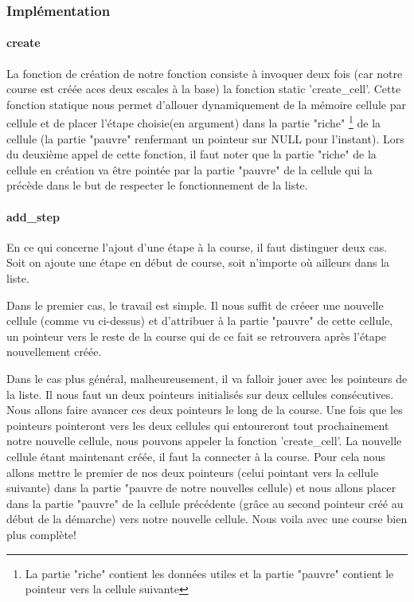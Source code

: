 \documentclass[a4paper, 11pt, oneside]{article}
\begin{document}
\subsubsection{Implémentation}

\paragraph{create}

La fonction de création de notre fonction consiste à invoquer deux fois (car notre course est créée aces deux escales à la base) la fonction static 'create\_cell'. Cette fonction statique nous permet d'allouer dynamiquement de la mémoire cellule par cellule et de placer l'étape choisie(en argument) dans la partie "riche" \footnote{La partie "riche" contient les données utiles et la partie "pauvre" contient le pointeur vers la cellule suivante} de la cellule (la partie "pauvre" renfermant un pointeur sur NULL pour l'instant). Lors du deuxième appel de cette fonction, il faut noter que la partie "riche" de la cellule en création va être pointée par la partie "pauvre" de la cellule qui la précède dans le but de respecter le fonctionnement de la liste. 


\paragraph{add\_step}

En ce qui concerne l'ajout d'une étape à la course, il faut distinguer deux cas. Soit on ajoute une étape en début de course, soit n'importe où ailleurs dans la liste.

Dans le premier cas, le travail est simple. Il nous suffit de créeer une nouvelle cellule (comme vu ci-dessus) et d'attribuer à la partie "pauvre" de cette cellule, un pointeur vers le reste de la course qui de ce fait se retrouvera après l'étape nouvellement créée.

Dans le cas plus général, malheureusement, il va falloir jouer avec les pointeurs de la liste. Il nous faut un deux pointeurs initialisés sur deux cellules consécutives. Nous allons faire avancer ces deux pointeurs le long de la course. Une fois que les pointeurs pointeront vers les deux cellules qui entoureront tout prochainement notre nouvelle cellule, nous pouvons appeler la fonction 'create\_cell'. La nouvelle cellule étant maintenant créée, il faut la connecter à la course. Pour cela nous allons mettre le premier de nos deux pointeurs (celui pointant vers la cellule suivante) dans la partie "pauvre de notre nouvelles cellule) et nous allons placer dans la partie "pauvre" de la cellule précédente (grâce au second pointeur créé au début de la démarche) vers notre nouvelle cellule. Nous voila avec une course bien plus complète!
\end{document}
